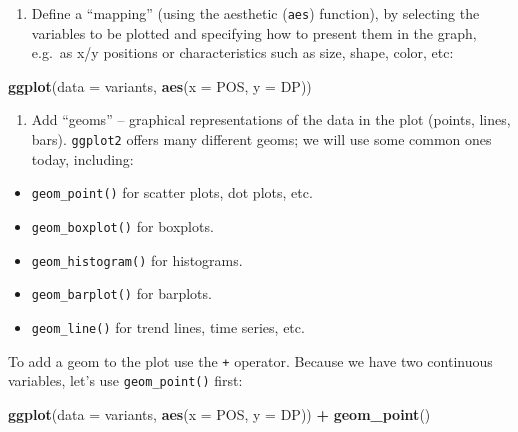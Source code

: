 \documentclass[]{book}
\newenvironment{Shaded}{\begin{snugshade}}{\end{snugshade}}
\newcommand{\DataTypeTok}[1]{\textcolor[rgb]{0.13,0.29,0.53}{#1}}
\newcommand{\KeywordTok}[1]{\textcolor[rgb]{0.13,0.29,0.53}{\textbf{#1}}}
\newcommand{\NormalTok}[1]{#1}
\newcommand{\OperatorTok}[1]{\textcolor[rgb]{0.81,0.36,0.00}{\textbf{#1}}}
\newcommand{\StringTok}[1]{\textcolor[rgb]{0.31,0.60,0.02}{#1}}
\providecommand{\tightlist}{%
  \setlength{\itemsep}{0pt}\setlength{\parskip}{0pt}}
\begin{document}
\begin{enumerate}
\def\labelenumi{\arabic{enumi}.}
\setcounter{enumi}{1}
\tightlist
\item
  Define a ``mapping'' (using the aesthetic (\texttt{aes}) function), by selecting the variables to be plotted and specifying how to present them in the graph, e.g.~as x/y positions or characteristics such as size, shape, color, etc:
\end{enumerate}

\begin{Shaded}
\begin{Highlighting}[]
\KeywordTok{ggplot}\NormalTok{(}\DataTypeTok{data =}\NormalTok{ variants, }\KeywordTok{aes}\NormalTok{(}\DataTypeTok{x =}\NormalTok{ POS, }\DataTypeTok{y =}\NormalTok{ DP))}
\end{Highlighting}
\end{Shaded}

\begin{enumerate}
\def\labelenumi{\arabic{enumi}.}
\setcounter{enumi}{2}
\tightlist
\item
  Add ``geoms'' -- graphical representations of the data in the plot (points, lines, bars). \texttt{ggplot2} offers many different geoms; we will use some common ones today, including:
\end{enumerate}

\begin{itemize}
\tightlist
\item
  \texttt{geom\_point()} for scatter plots, dot plots, etc.
\item
  \texttt{geom\_boxplot()} for boxplots.
\item
  \texttt{geom\_histogram()} for histograms.
\item
  \texttt{geom\_barplot()} for barplots.
\item
  \texttt{geom\_line()} for trend lines, time series, etc.
\end{itemize}

To add a geom to the plot use the \texttt{+} operator. Because we have two continuous variables, let's use \texttt{geom\_point()} first:

\begin{Shaded}
\begin{Highlighting}[]
\KeywordTok{ggplot}\NormalTok{(}\DataTypeTok{data =}\NormalTok{ variants, }\KeywordTok{aes}\NormalTok{(}\DataTypeTok{x =}\NormalTok{ POS, }\DataTypeTok{y =}\NormalTok{ DP)) }\OperatorTok{+}\StringTok{ }
\StringTok{  }\KeywordTok{geom_point}\NormalTok{()}
\end{Highlighting}
\end{Shaded}
\end{document}
